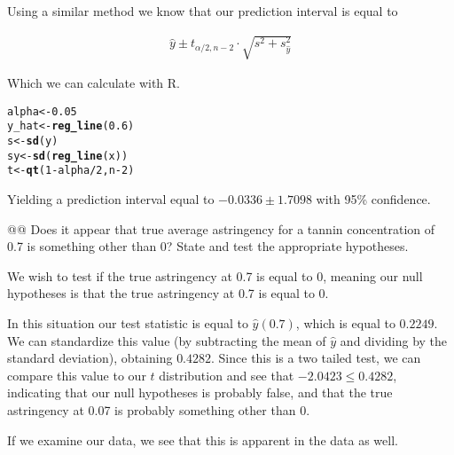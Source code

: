 \documentclass[10pt]{article}\usepackage[]{graphicx}\usepackage[]{xcolor}
\makeatletter
\newcommand{\hlnum}[1]{\textcolor[rgb]{0.686,0.059,0.569}{#1} }%
\newcommand{\hlopt}[1]{\textcolor[rgb]{0,0,0}{#1} }%
\newcommand{\hlstd}[1]{\textcolor[rgb]{0.345,0.345,0.345}{#1} }%
\newcommand{\hlkwb}[1]{\textcolor[rgb]{0.69,0.353,0.396}{#1} }%
\newcommand{\hlkwd}[1]{\textcolor[rgb]{0.737,0.353,0.396}{\textbf{#1} } }%
\newenvironment{kframe}{%
 \def\at@end@of@kframe{}%
 \ifinner\ifhmode%
  \def\at@end@of@kframe{\end{minipage} }%
  \begin{minipage}{\columnwidth}%
 \fi\fi%
 \def\FrameCommand##1{\hskip\@totalleftmargin \hskip-\fboxsep
 \colorbox{shadecolor}{##1}\hskip-\fboxsep
     \hskip-\linewidth \hskip-\@totalleftmargin \hskip\columnwidth}%
 \MakeFramed {\advance\hsize-\width
   \@totalleftmargin\z@ \linewidth\hsize
   \@setminipage} }%
 {\par\unskip\endMakeFramed%
 \at@end@of@kframe}
\newenvironment{knitrout}{}{} %
\makeatother
\begin{document}
\begin{easylist}[enumerate]
    Using a similar method we know that our prediction interval is equal to

    \begin{equation}
        \begin{aligned}
            \hat{y} \pm t_{\alpha / 2, n - 2} \cdot \sqrt{s^2 + s_{\hat{y} }^2}
        \end{aligned}
    \end{equation}

    Which we can calculate with R.

\begin{knitrout}
\color{fgcolor}\begin{kframe}
\begin{alltt}
         \hlstd{alpha} \hlkwb{<-} \hlnum{0.05}
         \hlstd{y_hat} \hlkwb{<-} \hlkwd{reg_line}\hlstd{(}\hlnum{0.6}\hlstd{)}
         \hlstd{s} \hlkwb{<-} \hlkwd{sd}\hlstd{(y)}
         \hlstd{sy} \hlkwb{<-} \hlkwd{sd}\hlstd{(}\hlkwd{reg_line}\hlstd{(x))}
         \hlstd{t} \hlkwb{<-} \hlkwd{qt}\hlstd{(}\hlnum{1} \hlopt{-} \hlstd{alpha} \hlopt{/} \hlnum{2}\hlstd{, n} \hlopt{-} \hlnum{2}\hlstd{)}
\end{alltt}
\end{kframe}
\end{knitrout}


    Yielding a prediction interval equal to $-0.0336 \pm 1.7098$ with 95\% confidence.

    @@ Does it appear that true average astringency for a tannin concentration of 0.7 is something other than 0? State
    and test the appropriate hypotheses.\newline

    We wish to test if the true astringency at 0.7 is equal to 0, meaning our null hypotheses is that the true
    astringency at 0.7 is equal to 0.\newline

    In this situation our test statistic is equal to $\hat{y}(0.7)$, which is equal to $0.2249$. We can
    standardize this value (by subtracting the mean of $\hat{y}$ and dividing by the standard deviation), obtaining
    $0.4282$. Since this is a two tailed test, we can compare
    this value to our $t$ distribution and see that $-2.0423 \le
    0.4282$, indicating that our null hypotheses is probably
    false, and that the true astringency at 0.07 is probably something other than 0.\newline

    If we examine our data, we see that this is apparent in the data as well.


\end{easylist}
\end{document}
